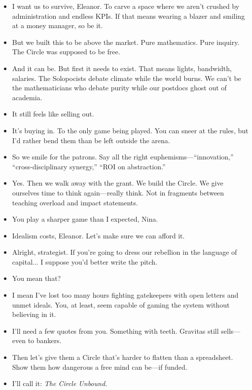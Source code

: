 \begin{itemize}[leftmargin=1.3cm]
\item[Nina:] I want us to survive, Eleanor. To carve a space where we aren’t crushed by administration and endless KPIs. If that means wearing a blazer and smiling at a money manager, so be it.

\item[Eleanor:] But we built this to be above the market. Pure mathematics. Pure inquiry. The Circle was supposed to be free.

\item[Nina:] And it can be. But first it needs to exist. That means lights, bandwidth, salaries. The Solopocists debate climate while the world burns. We can’t be the mathematicians who debate purity while our postdocs ghost out of academia.

\item[Eleanor:] It still feels like selling out.

\item[Nina:] It’s buying in. To the only game being played. You can sneer at the rules, but I’d rather bend them than be left outside the arena.

\item[Eleanor:] So we smile for the patrons. Say all the right euphemisms—“innovation,” “cross-disciplinary synergy,” “ROI on abstraction.”

\item[Nina:] Yes. Then we walk away with the grant. We build the Circle. We give ourselves time to think again—really think. Not in fragments between teaching overload and impact statements.

\item[Eleanor:] You play a sharper game than I expected, Nina.

\item[Nina:] Idealism costs, Eleanor. Let's make sure we can afford it.

\item[Eleanor:] Alright, strategist. If you’re going to dress our rebellion in the language of capital... I suppose you’d better write the pitch.

\item[Nina:] You mean that?

\item[Eleanor:] I mean I’ve lost too many hours fighting gatekeepers with open letters and unmet ideals. You, at least, seem capable of gaming the system without believing in it.

\item[Nina:] I’ll need a few quotes from you. Something with teeth. Gravitas still sells—even to bankers.

\item[Eleanor:] Then let’s give them a Circle that’s harder to flatten than a spreadsheet. Show them how dangerous a free mind can be—if funded.

\item[Nina:] I’ll call it: \emph{The Circle Unbound.}

\end{itemize}


